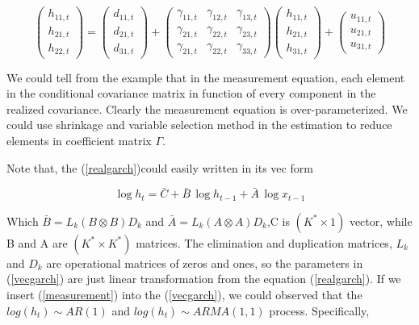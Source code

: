 \documentclass[titlepage,11pt]{article}
\begin{document}
\begin{equation*}
\left(\begin{array}{c}
h_{11,t}  \\
h_{21,t} \\
h_{22,t}\end{array}\right) = 
\left( \begin{array}{c}
d_{11,t}  \\
d_{21,t} \\
d_{31,t}\end{array}\right)
+ \left( \begin{array}{ccc}
\gamma_{11,t} & \gamma_{12,t}  & \gamma_{13,t} \\
\gamma_{21,t} & \gamma_{22,t}  & \gamma_{23,t} \\
\gamma_{21,t} & \gamma_{22,t}  & \gamma_{33,t}
\end{array} \right) 
\left(\begin{array}{c}
h_{11,t} \\
h_{21,t} \\
h_{31,t}
\end{array}\right)
+ \left(\begin{array}{c}
u_{11,t} \\
u_{21,t} \\
u_{31,t}
\end{array} \right)
\end{equation*}

We could tell from the example that in the measurement equation, each element in the conditional covariance matrix in function of every component in the realized covariance. Clearly the measurement equation is over-parameterized. We could use shrinkage and variable selection method in the estimation to reduce elements  in coefficient matrix $\Gamma$.

Note that, the (\ref{realgarch})could easily written in its vec form

\begin{equation}
\label{vecgarch}
\log h_t=\bar{C}+ \bar{B} \, \log h_{t-1}+\bar{A} \, \log x_{t-1}
\end{equation}

Which $\bar{B} = L_k(B\otimes B)D_k$ and $\bar{A} = L_k(A\otimes A)D_k$,C is $(K^* \times 1) $ vector, while B and A are $(K^* \times K^*)$ matrices. The elimination and duplication matrices, $L_k$ and $D_k$ are operational matrices of zeros and ones, so the parameters in (\ref{vecgarch}) are just linear transformation from the equation (\ref{realgarch}). If we insert (\ref{measurement}) into the (\ref{vecgarch}), we could  observed that the $log(h_t) \sim AR(1) $ and $log(h_t) \sim ARMA(1,1)$ process. Specifically, 
\end{document}

